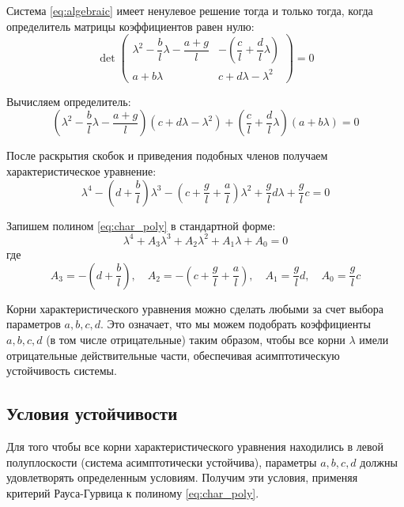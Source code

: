 \documentclass[a4paper, 12pt]{article}
\begin{document}
Система \eqref{eq:algebraic} имеет ненулевое решение тогда и только тогда, когда определитель матрицы коэффициентов равен нулю:
\begin{equation}
\det \begin{pmatrix}
\lambda^2 - \dfrac{b}{l}\lambda - \dfrac{a+g}{l} & -\left(\dfrac{c}{l} + \dfrac{d}{l}\lambda\right) \\[10pt]
a + b\lambda & c + d\lambda - \lambda^2
\end{pmatrix} = 0
\label{eq:det}
\end{equation}

Вычисляем определитель:
\begin{equation}
\left(\lambda^2 - \frac{b}{l}\lambda - \frac{a+g}{l}\right)\left(c + d\lambda - \lambda^2\right) + \left(\frac{c}{l} + \frac{d}{l}\lambda\right)(a + b\lambda) = 0
\end{equation}

После раскрытия скобок и приведения подобных членов получаем характеристическое уравнение:
\begin{equation}
\boxed{\lambda^4 - \left(d + \frac{b}{l}\right)\lambda^3 - \left(c + \frac{g}{l} + \frac{a}{l}\right)\lambda^2 + \frac{g}{l}d\lambda + \frac{g}{l}c = 0}
\label{eq:char_poly}
\end{equation}

Запишем полином \eqref{eq:char_poly} в стандартной форме:
\begin{equation}
\lambda^4 + A_3\lambda^3 + A_2\lambda^2 + A_1\lambda + A_0 = 0
\end{equation}
где
\begin{equation}
A_3 = -\left(d + \frac{b}{l}\right), \quad 
A_2 = -\left(c + \frac{g}{l} + \frac{a}{l}\right), \quad 
A_1 = \frac{g}{l}d, \quad 
A_0 = \frac{g}{l}c
\end{equation}

Корни характеристического уравнения можно сделать любыми за счет выбора параметров \(a, b, c, d\). Это означает, что мы можем подобрать коэффициенты \(a, b, c, d\) (в том числе отрицательные) таким образом, чтобы все корни \(\lambda\) имели отрицательные действительные части, обеспечивая асимптотическую устойчивость системы.

\subsection{Условия устойчивости}
Для того чтобы все корни характеристического уравнения находились в левой полуплоскости (система асимптотически устойчива), параметры \(a, b, c, d\) должны удовлетворять определенным условиям. Получим эти условия, применяя критерий Рауса-Гурвица к полиному \eqref{eq:char_poly}.
\end{document}
